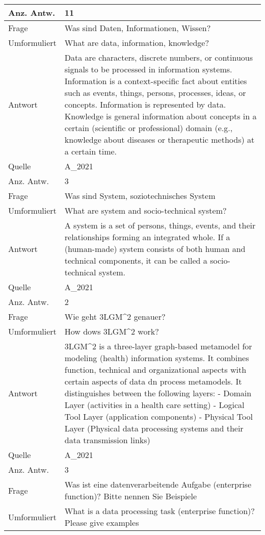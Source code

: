 \begin{landscape}
\begin{longtable}{p{3cm}p{}}
    Anz. Antw. & 11 \\
    \midrule
    Frage & Was sind Daten, Informationen, Wissen? \\
    Umformuliert & What are data, information, knowledge? \\
    Antwort & Data are characters, discrete numbers, or continuous signals to be processed in information systems.
    Information is a context-specific fact about entities such as events, things, persons, processes, ideas, or concepts.
    Information is represented by data.
    Knowledge is general information about concepts in a certain (scientific or professional) domain (e.g., knowledge about diseases or therapeutic methods) at a certain time.\\
    Quelle & A\_2021 \\
    Anz. Antw. & 3 \\
    \midrule
    Frage & Was sind System, soziotechnisches System \\
    Umformuliert & What are system and socio-technical system? \\
    Antwort & A system is a set of persons, things, events, and their relationships forming an integrated whole.
    If a (human-made) system consists of both human and technical components, it can be called a socio-technical system.\\
    Quelle & A\_2021 \\
    Anz. Antw. & 2 \\
    \midrule
    Frage & Wie geht 3LGM\textasciicircum{}2 genauer? \\
    Umformuliert & How dows 3LGM\textasciicircum{}2 work? \\
    Antwort & 3LGM\textasciicircum{}2 is a three-layer graph-based metamodel for modeling (health) information systems.
    It combines function, technical and organizational aspects with certain aspects of data dn process metamodels.
    It distinguishes between the following layers:
    - Domain Layer (activities in a health care setting)
    - Logical Tool Layer (application components)
    - Physical Tool Layer (Physical data processing systems and their data transmission links) \\
    Quelle & A\_2021 \\
    Anz. Antw. & 3 \\
    \midrule
    Frage & Was ist eine datenverarbeitende Aufgabe (enterprise function)? Bitte nennen Sie Beispiele \\
    Umformuliert & What is a data processing task (enterprise function)? Please give examples \\

\end{longtable}
\end{landscape}
